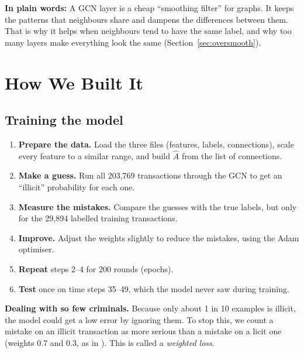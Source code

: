 \documentclass[11pt,a4paper]{article}
\newcommand{\Ahat}{\hat{A}}
\newcommand{\plain}[1]{\par\noindent\colorbox{notebg}{\parbox{\dimexpr\linewidth-2\fboxsep}{\small\textbf{In plain words:} #1}}\par}
\begin{document}
\plain{A GCN layer is a cheap ``smoothing filter'' for graphs. It keeps the patterns that neighbours share and dampens the
differences between them. That is why it helps when neighbours tend to have the same label, and why too many layers make
everything look the same (Section~\ref{sec:oversmooth}).}

\section{How We Built It}
\subsection{Training the model}
\begin{enumerate}
  \item \textbf{Prepare the data.} Load the three files (features, labels, connections), scale every feature to a similar range,
        and build $\Ahat$ from the list of connections.
  \item \textbf{Make a guess.} Run all 203,769 transactions through the GCN to get an ``illicit'' probability for each one.
  \item \textbf{Measure the mistakes.} Compare the guesses with the true labels, but only for the 29,894 labelled training
        transactions.
  \item \textbf{Improve.} Adjust the weights slightly to reduce the mistakes, using the Adam optimiser.
  \item \textbf{Repeat} steps 2--4 for 200 rounds (epochs).
  \item \textbf{Test} once on time steps 35--49, which the model never saw during training.
\end{enumerate}

\textbf{Dealing with so few criminals.} Because only about 1 in 10 examples is illicit, the model could get a low error by
ignoring them. To stop this, we count a mistake on an illicit transaction as more serious than a mistake on a licit one
(weights 0.7 and 0.3, as in \cite{weber}). This is called a \emph{weighted loss}.
\end{document}
